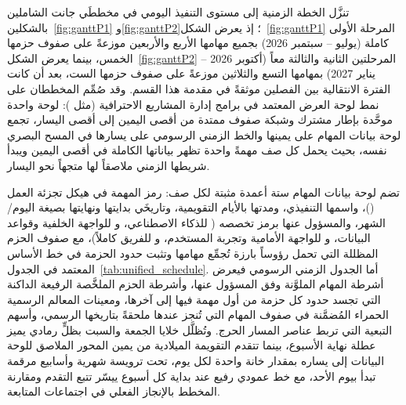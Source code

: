 تنزَّل الخطة الزمنية إلى مستوى التنفيذ اليومي في مخططَي جانت الشاملين
بالشكلين~\ref{fig:ganttP1} و\ref{fig:ganttP2}؛ إذ يعرض الشكل~\ref{fig:ganttP1}
المرحلة الأولى كاملة (يوليو -- سبتمبر 2026) بجميع مهامها الأربع والأربعين
موزعةً على صفوف حزمها الخمس، بينما يعرض الشكل~\ref{fig:ganttP2} المرحلتين
الثانية والثالثة معاً (أكتوبر 2026 -- يناير 2027) بمهامها التسع والثلاثين
موزعةً على صفوف حزمها الست، بعد أن كانت الفترة الانتقالية بين الفصلين
موثقةً في
مقدمة هذا القسم. وقد صُمِّم المخططان على نمط لوحة العرض المعتمد في
برامج إدارة المشاريع الاحترافية (مثل ): لوحة واحدة
موحَّدة بإطار مشترك وشبكة صفوف ممتدة من أقصى اليمين إلى أقصى اليسار،
تجمع لوحة بيانات المهام على يمينها والخط الزمني الرسومي على يسارها في
المسح البصري نفسه، بحيث يحمل كل صف مهمةً واحدة تظهر بياناتها الكاملة
في أقصى اليمين ويبدأ شريطها الزمني ملاصقاً لها متجهاً نحو اليسار.

تضم لوحة بيانات المهام ستة أعمدة مثبتة لكل صف: رمز المهمة في هيكل تجزئة
العمل ()، واسمها التنفيذي، ومدتها بالأيام التقويمية، وتاريخَي
بدايتها ونهايتها بصيغة اليوم/الشهر، والمسؤول عنها برمز تخصصه
( للذكاء الاصطناعي، و للواجهة الخلفية وقواعد البيانات،
و للواجهة الأمامية وتجربة المستخدم، و للفريق كاملاً)، مع
صفوف الحزم المظللة التي تحمل رؤوساً بارزة تُجمِّع مهامها وتثبت حدود
الحزمة في خط الأساس المعتمد في الجدول~\ref{tab:unified_schedule}. أما الجدول الزمني
الرسومي فيعرض أشرطة المهام الملوَّنة وفق المسؤول عنها، وأشرطة الحزم
الملخَّصة الرفيعة الداكنة التي تجسد حدود كل حزمة من أول مهمة فيها إلى
آخرها، ومعينات المعالم الرسمية الحمراء المُضمَّنة في صفوف المهام التي
تُنجز عندها ملحقةً بتاريخها الرسمي، وأسهم التبعية التي تربط عناصر المسار
الحرج. وتُظلَّل خلايا الجمعة والسبت بظلٍّ رمادي يميز عطلة نهاية الأسبوع، بينما
تتقدم التقويمة الميلادية من يمين المحور الملاصق للوحة البيانات إلى
يساره بمقدار خانة واحدة لكل يوم، تحت ترويسة شهرية وأسابيع مرقمة تبدأ
بيوم الأحد، مع خط عمودي رفيع عند بداية كل أسبوع ييسّر تتبع التقدم
ومقارنة المخطط بالإنجاز الفعلي في اجتماعات المتابعة.


